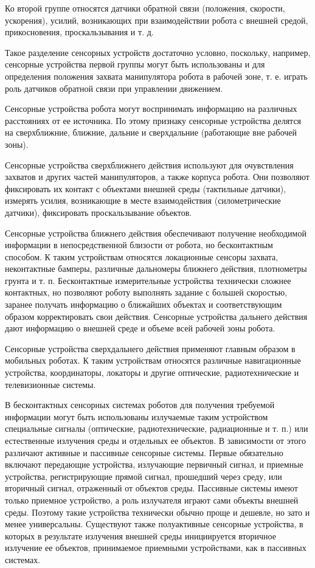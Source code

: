 Ко второй группе относятся датчики обратной связи (положения, скорости, ускорения), усилий, возникающих при взаимодействии робота с внешней средой, прикосновения, проскальзывания и т. д.

Такое разделение сенсорных устройств достаточно условно, поскольку, например, сенсорные устройства первой группы могут быть использованы и для определения положения захвата манипулятора робота в рабочей зоне, т. е. играть роль датчиков обратной связи при управлении движением.

Сенсорные устройства робота могут воспринимать информацию на различных расстояниях от ее источника. По этому признаку сенсорные устройства делятся на сверхближние, ближние, дальние и сверхдальние (работающие вне рабочей зоны).

Сенсорные устройства сверхближнего действия используют для очувствления захватов и других частей манипуляторов, а также корпуса робота. Они позволяют фиксировать их контакт с объектами внешней среды (тактильные датчики), измерять усилия, возникающие в месте взаимодействия (силометрические датчики), фиксировать проскальзывание объектов.

Сенсорные устройства ближнего действия обеспечивают получение необходимой информации в непосредственной близости от робота, но бесконтактным способом. К таким устройствам относятся локационные сенсоры захвата, неконтактные бамперы, различные дальномеры ближнего действия, плотнометры грунта и т. п. Бесконтактные измерительные устройства технически сложнее контактных, но позволяют роботу выполнять задание с большей скоростью, заранее получать информацию о ближайших объектах и соответствующим образом корректировать свои действия.
Сенсорные устройства дальнего действия дают информацию о внешней среде и объеме всей рабочей зоны робота.

Сенсорные устройства сверхдальнего действия применяют главным образом в мобильных роботах. К таким устройствам относятся различные навигационные устройства, координаторы, локаторы и другие оптические, радиотехнические и телевизионные системы.

В бесконтактных сенсорных системах роботов для получения требуемой информации могут быть использованы излучаемые таким устройством специальные сигналы (оптические, радиотехнические, радиационные и т. п.) или естественные излучения среды и отдельных ее объектов. В зависимости от этого различают активные и пассивные сенсорные системы. Первые обязательно включают передающие устройства, излучающие первичный сигнал, и приемные устройства, регистрирующие прямой сигнал, прошедший через среду, или вторичный сигнал, отраженный от объектов среды. Пассивные системы имеют только приемное устройство, а роль излучателя играют сами объекты внешней среды. Поэтому такие устройства технически обычно проще и дешевле, но зато и менее универсальны. Существуют также полуактивные сенсорные устройства, в которых в результате излучения внешней среды инициируется вторичное излучение ее объектов, принимаемое приемными устройствами, как в пассивных системах.
 
